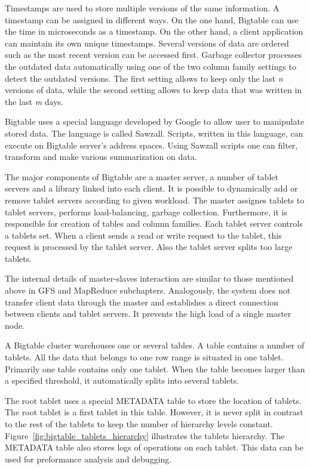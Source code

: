 Timestamps are used to store multiple versions of the same information.
A timestamp can be assigned in different ways.
On the one hand, Bigtable can use the time in microseconds as a timestamp.  
On the other hand, a client application can maintain its own unique timestamps.
Several versions of data are ordered such as the most recent version can be accessed first. 
Garbage collector processes the outdated data automatically using one of the two column family settings to detect the outdated versions.
The first setting allows to keep only the last \textit{n} versions of data, while the second setting allows to keep data that was written in the last \textit{m} days.

Bigtable uses a special language developed by Google to allow user to manipulate stored data.
The language is called Sawzall.
Scripts, written in this language, can execute on Bigtable server's address spaces.
Using Sawzall scripts one can filter, transform and make various summarization on data.

The major components of Bigtable are a master server, a number of tablet servers and a library linked into each client.
It is possible to dynamically add or remove tablet servers according to given workload.
The master assignes tablets to tablet servers, performs load-balancing, garbage collection.
Furthermore, it is responsible for creation of tables and column families.
Each tablet server controls a tablets set.
When a client sends a read or write request to the tablet, this request is processed by the tablet server.
Also the tablet server splits too large tablets.

The internal details of master-slaves interaction are similar to those mentioned above in GFS and MapReduce subchapters.
Analogously, the system does not transfer client data through the master and establishes a direct connection between clients and tablet servers.
It prevents the high load of a single master node.

A Bigtable cluster warehouses one or several tables.
A table contains a number of tablets. 
All the data that belongs to one row range is situated in one tablet.
Primarily one table contains only one tablet.
When the table becomes larger than a specified threshold, it automatically splits into several tablets.

The root tablet uses a special METADATA table to store the location of tablets.
The root tablet is a first tablet in this table.
However, it is never split in contrast to the rest of the tablets to keep the number of hierarchy levels constant.
Figure~\ref{fig:bigtable_tablets_hierarchy} illustrates the tablets hierarchy.
The METADATA table also stores logs of operations on each tablet.
This data can be used for preformance analysis and debugging.  

